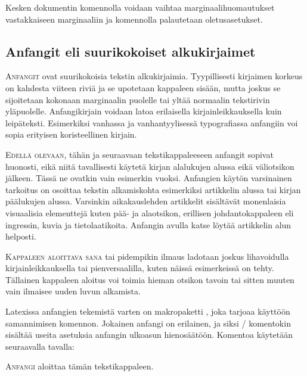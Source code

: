 Kesken dokumentin komennolla  voidaan vaihtaa
marginaalihuomautukset vastakkaiseen marginaaliin ja komennolla
 palautetaan oletusasetukset.

\subsection{Anfangit eli suurikokoiset alkukirjaimet}

\lettrine[lines=3, loversize=.06, lhang=.02, findent=-5bp, nindent=4bp,
slope=4bp]{A}{nfangit} ovat suurikokoisia tekstin alkukirjaimia.
Tyypillisesti kirjaimen korkeus on kahdesta viiteen riviä ja se
upotetaan kappaleen sisään, mutta joskus se sijoitetaan kokonaan
marginaalin puolelle tai yltää normaalin tekstirivin yläpuolelle.
Anfangikirjain voidaan latoa erilaisella kirjainleikkauksella kuin
leipäteksti. Esimerkiksi vanhassa ja vanhantyylisessä typografiassa
anfangiin voi sopia erityisen koristeellinen kirjain.

\smallskip

\lettrine[lines=2, lhang=1, nindent=0bp]{E\hspace{1.5bp}}{dellä
  olevaan}, tähän ja seuraavaan tekstikappaleeseen anfangit sopivat
huonosti, eikä niitä tavallisesti käytetä kirjan alalukujen alussa eikä
väliotsikon jälkeen. Tässä ne ovatkin vain esimerkin vuoksi. Anfangien
käytön varsinainen tarkoitus on osoittaa tekstin alkamiskohta
esimerkiksi artikkelin alussa tai kirjan päälukujen alussa. Varsinkin
aikakauslehden artikkelit sisältävät monenlaisia visuaalisia elementtejä
kuten pää- ja alaotsikon, erillisen johdantokappaleen eli ingressin,
kuvia ja tietolaatikoita. Anfangin avulla katse löytää artikkelin alun
helposti.

\lettrine[lines=1, loversize=.1, lhang=.02, findent=1.5bp]{K}{appaleen
  aloittava sana} tai pidempikin ilmaus ladotaan joskus lihavoidulla
kirjainleikkauksella tai pienversaalilla, kuten näissä esimerkeissä on
tehty. Tällainen kappaleen aloitus voi toimia hieman otsikon tavoin tai
sitten muuten vain ilmaisee uuden luvun alkamista.

Latexissa anfangien tekemistä varten on makropaketti
, joka tarjoaa käyttöön samannimisen
komennon. Jokainen anfangi on erilainen, ja siksi \-/
komentokin sisältää useita asetuksia anfangin ulkoasun hienosäätöön.
Komentoa käytetään seuraavalla tavalla:

\begin{koodilohkosis}
\lettrine[lines=3, loversize=.06, lhang=.02, findent=-5bp,
  nindent=4bp, slope=4bp]{A}{nfangi} aloittaa tämän tekstikappaleen.
\end{koodilohkosis}

